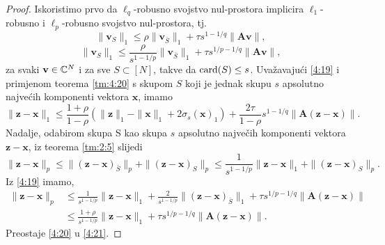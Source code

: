 \documentclass[a4paper,twoside,12pt]{memoir} %
\newcommand{\vect}[1]{\mathbf{#1}}
\renewcommand{\vec}{\vect}
\newcommand{\card}{\text{\normalfont{card}}}
\newcommand{\norm}[1]{\|{#1}\|}
\begin{document}
\begin{proof}
    Iskoristimo prvo da $\ell_q$-robusno svojstvo nul-prostora implicira $\ell_1$-robusno i $\ell_p$-robusno svojstvo nul-prostora, tj.
    \begin{equation}\label{4:18}
        \norm{\vec v_S}_1 \leq \rho \norm{\vec v_{\bar S}}_1 + \tau s^{1-1/q} \norm{\vec{Av}},
    \end{equation}
    \begin{equation}\label{4:19}
        \norm{\vec v_S}_1 \leq \frac{\rho}{s^{1-1/p}} \norm{\vec v_{\bar S}}_1 + \tau s^{1/p - 1/q} \norm{\vec{Av}},
    \end{equation}
    za svaki $\vec v \in \C^N$ i za sve $S \subset [N]$, takve da $\card(S) \leq s$. Uva\v{z}avaju\'ci \eqref{4:19} i primjenom teorema \ref{tm:4:20} s skupom $S$ koji je jednak skupu $s$ apsolutno najve\'cih komponenti vektora $\vec x$, imamo
    \begin{equation}\label{4:20}
        \norm{\vec z - \vec x}_1 \leq \frac{1+\rho}{1-\rho}(\norm{\vec z }_1 - \norm{\vec x}_1 + 2 \sigma_s(\vec x)_1)+ \frac{2 \tau}{1 - \rho}s^{1-1/q} \norm{\vec A (\vec z - \vec x)}.
    \end{equation}
    Nadalje, odabirom skupa S kao skupa $s$ apsolutno najve\v{c}ih komponenti vektora $\vec z - \vec x$, iz teorema \ref{tm:2:5} slijedi
    \begin{equation*}
        \norm{\vec z - \vec x}_p \leq \norm{(\vec z - \vec x)_{\bar S}}_p + \norm{(\vec z - \vec x)_S}_p \leq \frac{1}{s^{1-1/p}}\norm{\vec z - \vec x}_1 + \norm{(\vec z - \vec x)_S}_p.
    \end{equation*}
    Iz \eqref{4:19} imamo,
    \begin{align}\label{4:21}
        \norm{\vec z - \vec x}_p &\leq \frac{1}{s^{1-1/p}} \norm{\vec z - \vec x}_1 + \frac{2}{s^{1-1/p}} \norm{(\vec z - \vec x)_{\bar S}}_1 + \tau s^{1/p - 1/q} \norm{\vec A (\vec z - \vec x)}\nonumber \\
        &\leq  \frac{1+\rho}{s^{1-1/p}}  \norm{\vec z - \vec x}_1 + \tau s^{1/p - 1/q} \norm{ \vec A (\vec z - \vec x)}.
    \end{align}
    Preostaje \eqref{4:20} u \eqref{4:21}.
\end{proof}
\end{document}
